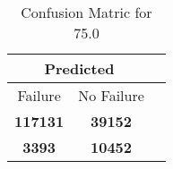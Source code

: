 \begin{table}[] 
\caption{Confusion Matric for 75.0} 
\label{Table: Prediction Accuracy-None75.0SVMEKF-ignoreReflection-Reflection} 
\centering 
\begin{tabular} 
 {@{}ccc@{}} 
\toprule 
\multicolumn{2}{c}{\textbf{Predicted}}
 \\ \midrule 
\multicolumn{1}{|c|}{Failure} & 
\multicolumn{1}{c|}{No Failure}
 \\ \midrule 
\multicolumn{1}{|c|}{\color{green}\textbf{117131}} & 
\multicolumn{1}{c|}{\color{green}\textbf{39152}}
 \\ \midrule 
\multicolumn{1}{|c|}{\color{red}\textbf{3393}} & 
\multicolumn{1}{c|}{\color{red}\textbf{10452}}
 \\ \bottomrule 
\end{tabular} 
\end{table} 

